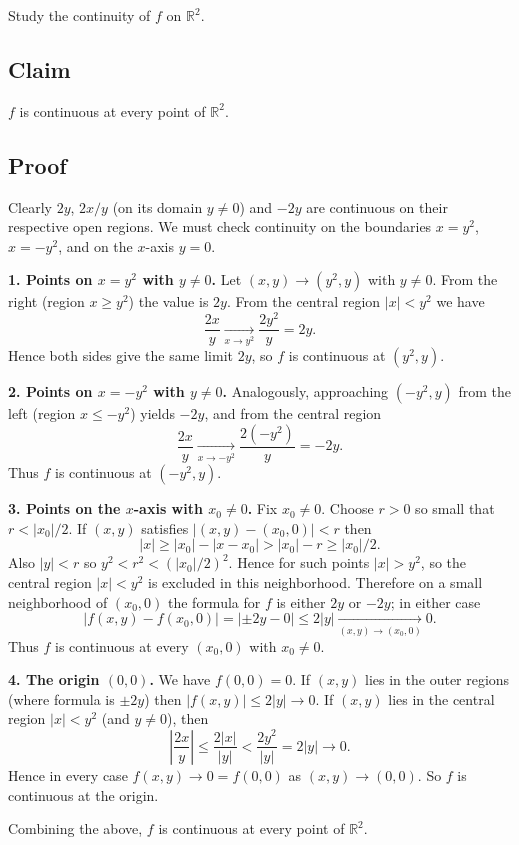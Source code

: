 \documentclass[12pt]{article}
\begin{document}
Study the continuity of $f$ on $\mathbb{R}^2$.

\begin{correctionbox}
\subsection*{Claim}
\(f\) is continuous at every point of \(\mathbb{R}^2\).

\subsection*{Proof}
Clearly \(2y\), \(2x/y\) (on its domain \(y\neq0\)) and \(-2y\) are continuous on their respective open regions. We must check continuity on the boundaries \(x=y^2\), \(x=-y^2\), and on the \(x\)-axis \(y=0\).

\medskip

\textbf{1. Points on \(x=y^2\) with \(y\neq0\).}  
Let \((x,y)\to (y^2,y)\) with \(y\neq0\). From the right (region \(x\ge y^2\)) the value is \(2y\). From the central region \(|x|<y^2\) we have
\[
\frac{2x}{y}\xrightarrow[x\to y^2]{}\frac{2y^2}{y}=2y.
\]
Hence both sides give the same limit \(2y\), so \(f\) is continuous at \((y^2,y)\).

\medskip

\textbf{2. Points on \(x=-y^2\) with \(y\neq0\).}  
Analogously, approaching \(( -y^2,y)\) from the left (region \(x\le -y^2\)) yields \(-2y\), and from the central region
\[
\frac{2x}{y}\xrightarrow[x\to -y^2]{}\frac{2(-y^2)}{y}=-2y.
\]
Thus \(f\) is continuous at \(( -y^2,y)\).

\medskip

\textbf{3. Points on the \(x\)-axis with \(x_0\neq0\).}  
Fix \(x_0\neq0\). Choose \(r>0\) so small that \(r<|x_0|/2\). If \((x,y)\) satisfies \(|(x,y)-(x_0,0)|<r\) then
\[
|x|\ge |x_0|-|x-x_0|> |x_0|-r \ge |x_0|/2.
\]
Also \(|y|<r\) so \(y^2<r^2<(|x_0|/2)^2\). Hence for such points \(|x|>y^2\), so the central region \(|x|<y^2\) is excluded in this neighborhood. Therefore on a small neighborhood of \((x_0,0)\) the formula for \(f\) is either \(2y\) or \(-2y\); in either case
\[
|f(x,y)-f(x_0,0)|=| \pm 2y - 0| \le 2|y|\xrightarrow[(x,y)\to(x_0,0)]{}0.
\]
Thus \(f\) is continuous at every \((x_0,0)\) with \(x_0\neq0\).

\medskip

\textbf{4. The origin \((0,0)\).}  
We have \(f(0,0)=0\). If \((x,y)\) lies in the outer regions (where formula is \(\pm 2y\)) then \(|f(x,y)|\le 2|y|\to0\). If \((x,y)\) lies in the central region \(|x|<y^2\) (and \(y\neq0\)), then
\[
\left|\frac{2x}{y}\right|\le \frac{2|x|}{|y|}<\frac{2y^2}{|y|}=2|y|\to0.
\]
Hence in every case \(f(x,y)\to0=f(0,0)\) as \((x,y)\to(0,0)\). So \(f\) is continuous at the origin.

\medskip

Combining the above, \(f\) is continuous at every point of \(\mathbb{R}^2\).
\end{correctionbox}
\end{document}
